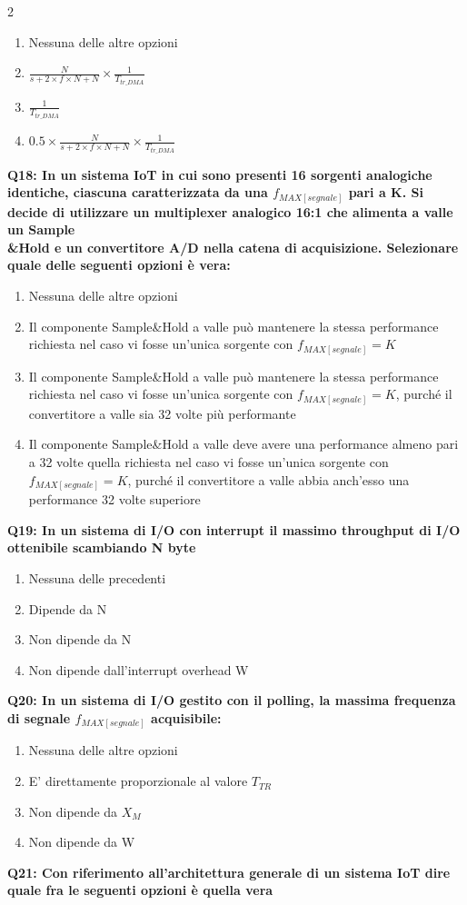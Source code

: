 \documentclass[10pt]{article}
\begin{document}
\begin{multicols}{2}
\begin{enumerate}[label=\arabic*.]
\item Nessuna delle altre opzioni
\item $\frac{N}{s+ 2 \times f \times N + N} \times \frac{1}{T_{tr\_DMA}} $
\item $\frac{1}{T_{tr\_DMA}}$
\item $0.5 \times \frac{N}{s+ 2 \times f \times N + N} \times \frac{1}{T_{tr\_DMA}} $
\end{enumerate}
\textbf{Q18: In un sistema IoT in cui sono presenti 16 sorgenti analogiche identiche, ciascuna caratterizzata da una $f_{MAX[segnale]}$ pari a K. Si decide di utilizzare un multiplexer analogico 16:1 che alimenta a valle un Sample\\\&Hold e un convertitore A/D nella catena di acquisizione. Selezionare quale delle seguenti opzioni è vera:}

\begin{enumerate}[label=\arabic*.]
\item Nessuna delle altre opzioni
\item Il componente Sample\&Hold a valle può mantenere la stessa performance richiesta nel caso vi fosse un'unica sorgente con $f_{MAX[segnale]} = K$
\item Il componente Sample\&Hold a valle può mantenere la stessa performance richiesta nel caso vi fosse un'unica sorgente con $f_{MAX[segnale]} = K$, purché il convertitore a valle sia 32 volte più performante
\item Il componente Sample\&Hold a valle deve avere una performance almeno pari a 32 volte quella richiesta nel caso vi fosse un'unica sorgente con $f_{MAX[segnale]} = K$, purché il convertitore a valle abbia anch’esso una performance 32 volte superiore
\end{enumerate}
\textbf{Q19: In un sistema di I/O con interrupt il massimo throughput di I/O ottenibile scambiando N byte}

\begin{enumerate}[label=\arabic*.]
\item Nessuna delle precedenti
\item Dipende da N
\item Non dipende da N
\item Non dipende dall’interrupt overhead W
\end{enumerate}
\textbf{Q20: In un sistema di I/O gestito con il polling, la massima frequenza di segnale $f_{MAX[segnale]}$ acquisibile:}

\begin{enumerate}[label=\arabic*.]
\item Nessuna delle altre opzioni
\item E' direttamente proporzionale al valore $T_{TR}$
\item Non dipende da $X_M$
\item Non dipende da W
\end{enumerate}
\textbf{Q21: Con riferimento all’architettura generale di un sistema IoT dire quale fra le seguenti opzioni è quella vera}


\end{multicols}
\end{document}
